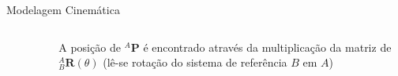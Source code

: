 \documentclass{beamer}
\begin{document}
\begin{frame}[t]{Modelagem Cinemática}
\begin{itemize}
\begin{columns}
\begin{column}[c]{0.5\textwidth}
\begin{figure}[!ht]
                \end{figure}
            \end{column}
            \begin{column}[c]{0.5\textwidth}
                A posição de ${}^A\mathbf{P}$ é encontrado através da multiplicação da matriz de ${}_B^A \mathbf{R}(\theta)$ (lê-se rotação do sistema de referência $B$ em $A$)
            \end{column}
        \end{columns}
    \end{itemize}
\end{frame}
\end{document}
